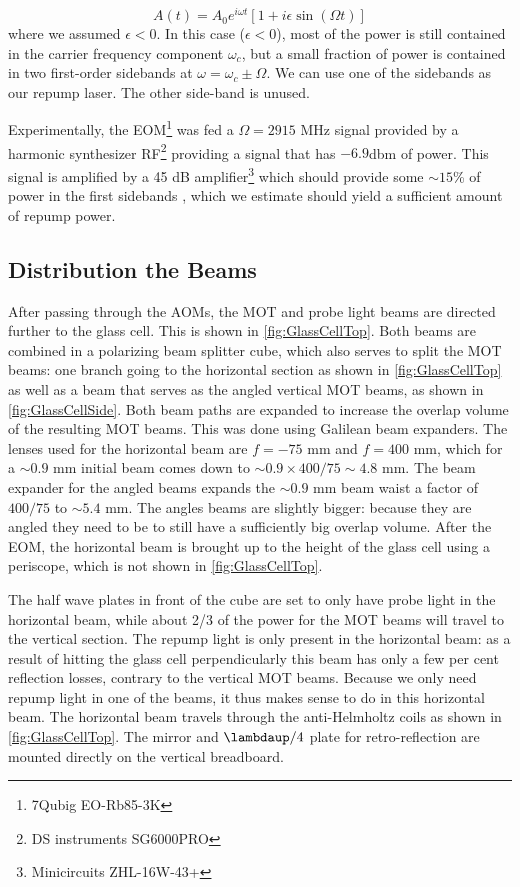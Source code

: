 \begin{equation}
    A(t) = A_0 e^{i \omega t}\left[1+i \epsilon \sin(\Omega t)\right]
\end{equation}
where we assumed $\epsilon < 0$. In this case ($\epsilon <0$), most of the power is still contained in the carrier frequency component $\omega_c$, but a small fraction of power is contained in two first-order sidebands at $\omega=\omega_c \pm \Omega$.
We can use one of the sidebands as our repump laser. 
The other side-band is unused. 

Experimentally, the EOM\footnote{7Qubig EO-Rb85-3K} was fed a $\Omega = 2915$ MHz signal provided by a harmonic synthesizer RF\footnote{DS instruments SG6000PRO} providing a signal that has $-6.9$dbm of power.
This signal is amplified by a 45 dB amplifier\footnote{Minicircuits ZHL-16W-43+} which should provide some $\sim 15$\% of power in the first sidebands \cite{Rens2014}, which we estimate should yield a sufficient amount of repump power. 

\subsection{Distribution the Beams}

After passing through the AOMs, the MOT and probe light beams are directed further to the glass cell. 
This is shown in \cref{fig:GlassCellTop}.
Both beams are combined in a polarizing beam splitter cube, which also serves to split the MOT beams: one branch going to the horizontal section as shown in \cref{fig:GlassCellTop} as well as a beam that serves as the angled vertical MOT beams, as shown in \cref{fig:GlassCellSide}. 
Both beam paths are expanded to increase the overlap volume of the resulting MOT beams.
This was done using Galilean beam expanders. 
The lenses used for the horizontal beam are $f=-75$ mm and $f=400$ mm, which for a $\sim 0.9$ mm initial beam comes down to $\sim 0.9 \times 400/75 \sim 4.8$ mm.
The beam expander for the angled beams expands the $\sim0.9$ mm beam waist a factor of $400/75$ to $\sim5.4$ mm.
The angles beams are slightly bigger: because they are angled they need to be to still have a sufficiently big overlap volume. 
After the EOM, the horizontal beam is brought up to the height of the glass cell using a periscope, which is not shown in \cref{fig:GlassCellTop}.

The half wave plates in front of the cube are set to only have probe light in the horizontal beam, while about 2/3 of the power for the MOT beams will travel to the vertical section. 
The repump light is only present in the horizontal beam: as a result of hitting the glass cell perpendicularly this beam has only a few per cent reflection losses, contrary to the vertical MOT beams. 
Because we only need repump light in one of the beams, it thus makes sense to do in this horizontal beam. 
The horizontal beam travels through the anti-Helmholtz coils as shown in \cref{fig:GlassCellTop}.
The mirror and $\lambdaup/4$ plate for retro-reflection are mounted directly on the vertical breadboard. 


